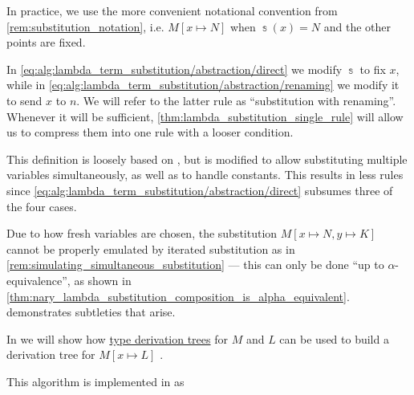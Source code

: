 \begin{comments}
  \item In practice, we use the more convenient notational convention from \cref{rem:substitution_notation}, i.e. \( M[x \mapsto N] \) when \( \Bbbs(x) = N \) and the other points are fixed.

  \item In \eqref{eq:alg:lambda_term_substitution/abstraction/direct} we modify \( \Bbbs \) to fix \( x \), while in \eqref{eq:alg:lambda_term_substitution/abstraction/renaming} we modify it to send \( x \) to \( n \). We will refer to the latter rule as \enquote{substitution with renaming}. Whenever it will be sufficient, \cref{thm:lambda_substitution_single_rule} will allow us to compress them into one rule with a looser condition.

  \item This definition is loosely based on \cite[def. 1A7]{Hindley1997BasicSTT}, but is modified to allow substituting multiple variables simultaneously, as well as to handle constants. This results in less rules since \eqref{eq:alg:lambda_term_substitution/abstraction/direct} subsumes three of the four cases.

  \item Due to how fresh variables are chosen, the substitution \( M[x \mapsto N, y \mapsto K] \) cannot be properly emulated by iterated substitution as in \cref{rem:simulating_simultaneous_substitution} --- this can only be done \enquote{up to \( \alpha \)-equivalence}, as shown in \cref{thm:nary_lambda_substitution_composition_is_alpha_equivalent}.  demonstrates subtleties that arise.

  \item In  we will show how \hyperref[def:type_derivation_tree]{type derivation trees} for \( M \) and \( L \) can be used to build a derivation tree for \( M[x \mapsto L] \) .

  \item This algorithm is implemented in \cite{notebook:code} as
  \begin{CodeRefDisplay}
  \end{CodeRefDisplay}
\end{comments}

